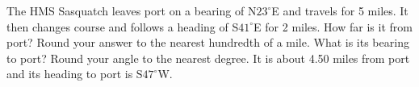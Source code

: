 { The HMS Sasquatch leaves port on a bearing of N$23^{\circ}$E and travels for 5 miles.  It then changes course and follows a heading of S$41^{\circ}$E for 2 miles.  How far is it from port? Round your answer to the nearest hundredth of a mile. What is its bearing to port?  Round your angle to the nearest degree.}
{ It is about 4.50 miles from port and its heading to port is S$47^{\circ}$W.}

